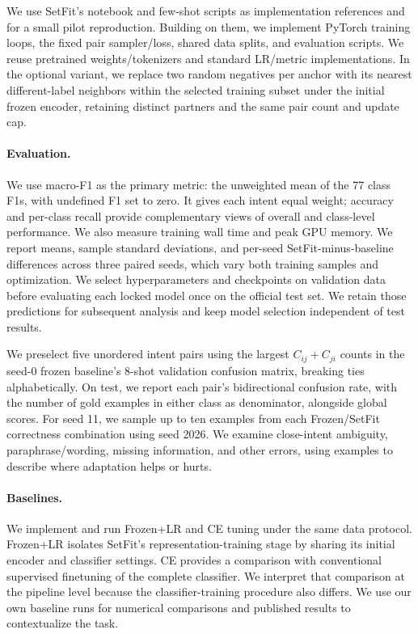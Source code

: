 \documentclass{article}
\begin{document}
We use SetFit's notebook and few-shot scripts \cite{setfitcode} as implementation references and for a small pilot reproduction. Building on them, we implement PyTorch training loops, the fixed pair sampler/loss, shared data splits, and evaluation scripts. We reuse pretrained weights/tokenizers and standard LR/metric implementations. In the optional variant, we replace two random negatives per anchor with its nearest different-label neighbors within the selected training subset under the initial frozen encoder, retaining distinct partners and the same pair count and update cap.

\paragraph{Evaluation.}
We use macro-F1 as the primary metric: the unweighted mean of the 77 class F1s, with undefined F1 set to zero. It gives each intent equal weight; accuracy and per-class recall provide complementary views of overall and class-level performance. We also measure training wall time and peak GPU memory. We report means, sample standard deviations, and per-seed SetFit-minus-baseline differences across three paired seeds, which vary both training samples and optimization. We select hyperparameters and checkpoints on validation data before evaluating each locked model once on the official test set. We retain those predictions for subsequent analysis and keep model selection independent of test results.

We preselect five unordered intent pairs using the largest $C_{ij}+C_{ji}$ counts in the seed-0 frozen baseline's 8-shot validation confusion matrix, breaking ties alphabetically. On test, we report each pair's bidirectional confusion rate, with the number of gold examples in either class as denominator, alongside global scores. For seed 11, we sample up to ten examples from each Frozen/SetFit correctness combination using seed 2026. We examine close-intent ambiguity, paraphrase/wording, missing information, and other errors, using examples to describe where adaptation helps or hurts.

\paragraph{Baselines.}
We implement and run Frozen+LR and CE tuning under the same data protocol. Frozen+LR isolates SetFit's representation-training stage by sharing its initial encoder and classifier settings. CE provides a comparison with conventional supervised finetuning of the complete classifier. We interpret that comparison at the pipeline level because the classifier-training procedure also differs. We use our own baseline runs for numerical comparisons and published results to contextualize the task.
\end{document}
